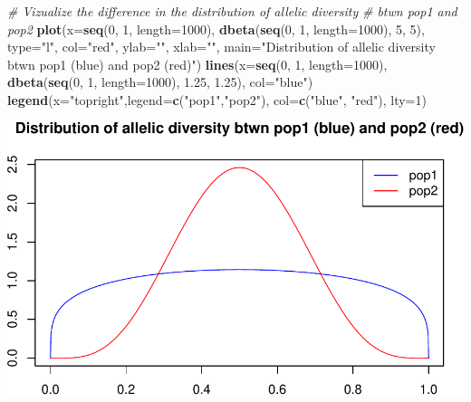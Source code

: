 \documentclass[]{article}
\newenvironment{Shaded}{\begin{snugshade}}{\end{snugshade}}
\newcommand{\KeywordTok}[1]{\textcolor[rgb]{0.13,0.29,0.53}{\textbf{{#1}}}}
\newcommand{\DataTypeTok}[1]{\textcolor[rgb]{0.13,0.29,0.53}{{#1}}}
\newcommand{\DecValTok}[1]{\textcolor[rgb]{0.00,0.00,0.81}{{#1}}}
\newcommand{\FloatTok}[1]{\textcolor[rgb]{0.00,0.00,0.81}{{#1}}}
\newcommand{\StringTok}[1]{\textcolor[rgb]{0.31,0.60,0.02}{{#1}}}
\newcommand{\CommentTok}[1]{\textcolor[rgb]{0.56,0.35,0.01}{\textit{{#1}}}}
\newcommand{\NormalTok}[1]{{#1}}
\begin{document}
\begin{Shaded}
\begin{Highlighting}[]
\CommentTok{# Vizualize the difference in the distribution of allelic diversity}
\CommentTok{# btwn pop1 and pop2}
\KeywordTok{plot}\NormalTok{(}\DataTypeTok{x=}\KeywordTok{seq}\NormalTok{(}\DecValTok{0}\NormalTok{, }\DecValTok{1}\NormalTok{, }\DataTypeTok{length=}\DecValTok{1000}\NormalTok{), }\KeywordTok{dbeta}\NormalTok{(}\KeywordTok{seq}\NormalTok{(}\DecValTok{0}\NormalTok{, }\DecValTok{1}\NormalTok{, }\DataTypeTok{length=}\DecValTok{1000}\NormalTok{), }\DecValTok{5}\NormalTok{, }\DecValTok{5}\NormalTok{), }\DataTypeTok{type=}\StringTok{"l"}\NormalTok{, }\DataTypeTok{col=}\StringTok{"red"}\NormalTok{, }\DataTypeTok{ylab=}\StringTok{""}\NormalTok{, }\DataTypeTok{xlab=}\StringTok{""}\NormalTok{, }
     \DataTypeTok{main=}\StringTok{"Distribution of allelic diversity btwn pop1 (blue) and pop2 (red)"}\NormalTok{)}
\KeywordTok{lines}\NormalTok{(}\DataTypeTok{x=}\KeywordTok{seq}\NormalTok{(}\DecValTok{0}\NormalTok{, }\DecValTok{1}\NormalTok{, }\DataTypeTok{length=}\DecValTok{1000}\NormalTok{), }\KeywordTok{dbeta}\NormalTok{(}\KeywordTok{seq}\NormalTok{(}\DecValTok{0}\NormalTok{, }\DecValTok{1}\NormalTok{, }\DataTypeTok{length=}\DecValTok{1000}\NormalTok{), }\FloatTok{1.25}\NormalTok{, }\FloatTok{1.25}\NormalTok{), }\DataTypeTok{col=}\StringTok{"blue"}\NormalTok{)}
\KeywordTok{legend}\NormalTok{(}\DataTypeTok{x=}\StringTok{"topright"}\NormalTok{,}\DataTypeTok{legend=}\KeywordTok{c}\NormalTok{(}\StringTok{"pop1"}\NormalTok{,}\StringTok{"pop2"}\NormalTok{), }\DataTypeTok{col=}\KeywordTok{c}\NormalTok{(}\StringTok{"blue"}\NormalTok{, }\StringTok{"red"}\NormalTok{), }\DataTypeTok{lty=}\DecValTok{1}\NormalTok{)}
\end{Highlighting}
\end{Shaded}

\medskip
\begin{center}
\includegraphics{example-analyses_files/figure-latex/unnamed-chunk-2-1.pdf}
\end{center}
\medskip
\end{document}
